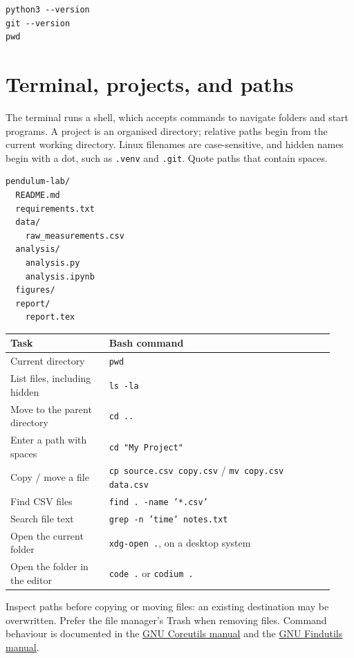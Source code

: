 \documentclass[11pt]{article}
\begin{document}
\begin{lstlisting}
python3 --version
git --version
pwd
\end{lstlisting}

\tableofcontents
\newpage

\section{Terminal, projects, and paths}
The terminal runs a shell, which accepts commands to navigate folders and
start programs. A project is an organised directory; relative paths begin
from the current working directory. Linux filenames are case-sensitive, and
hidden names begin with a dot, such as \texttt{.venv} and \texttt{.git}.
Quote paths that contain spaces.

\begin{lstlisting}
pendulum-lab/
  README.md
  requirements.txt
  data/
    raw_measurements.csv
  analysis/
    analysis.py
    analysis.ipynb
  figures/
  report/
    report.tex
\end{lstlisting}

\begin{longtable}{p{0.29\linewidth}p{0.64\linewidth}}
\toprule Task & Bash command\\ \midrule
Current directory & \texttt{pwd}\\
List files, including hidden & \texttt{ls -la}\\
Move to the parent directory & \texttt{cd ..}\\
Enter a path with spaces & \texttt{cd "My Project"}\\
Copy / move a file & \texttt{cp source.csv copy.csv} / \texttt{mv copy.csv data.csv}\\
Find CSV files & \texttt{find . -name '*.csv'}\\
Search file text & \texttt{grep -n 'time' notes.txt}\\
Open the current folder & \texttt{xdg-open .}, on a desktop system\\
Open the folder in the editor & \texttt{code .} or \texttt{codium .}\\
\bottomrule
\end{longtable}
Inspect paths before copying or moving files: an existing destination may be
overwritten. Prefer the file manager's Trash when removing files.
Command behaviour is documented in the
\href{https://www.gnu.org/software/coreutils/manual/coreutils.html}{GNU
Coreutils manual} and the
\href{https://www.gnu.org/software/findutils/manual/html_mono/find.html}{GNU
Findutils manual}.
\end{document}
